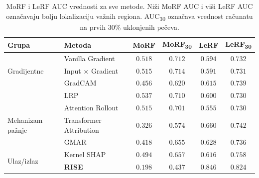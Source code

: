 \begin{table}[h]
\centering
\caption{MoRF i LeRF AUC vrednosti za sve metode. Niži MoRF AUC i 
viši LeRF AUC označavaju bolju lokalizaciju važnih regiona. 
AUC\textsubscript{30} označava vrednost računatu na prvih 30\% 
uklonjenih pečeva.}
\label{tab:morf_lerf}
\begin{tabular}{llcccc}
\hline
\textbf{Grupa} & \textbf{Metoda} & \textbf{MoRF} & \textbf{MoRF\textsubscript{30}} & \textbf{LeRF} & \textbf{LeRF\textsubscript{30}} \\
\hline
\multirow{3}{*}{Gradijentne}
    & Vanilla Gradient        & $0.518$ & $0.712$ & $0.594$ & $0.732$ \\
    & Input $\times$ Gradient & $0.515$ & $0.714$ & $0.591$ & $0.731$ \\
    & GradCAM                 & $0.456$ & $0.620$ & $0.615$ & $0.739$ \\
\hline
    & LRP                     & $0.537$ & $0.710$ & $0.600$ & $0.730$ \\
\hline
\multirow{3}{*}{Mehanizam pažnje}
    & Attention Rollout       & $0.515$ & $0.701$ & $0.555$ & $0.730$ \\
    & Transformer Attribution & $0.326$ & $0.574$ & $0.660$ & $0.742$ \\
    & GMAR                    & $0.418$ & $0.655$ & $0.628$ & $0.736$ \\
\hline
\multirow{2}{*}{Ulaz/izlaz}
    & Kernel SHAP             & $0.494$ & $0.657$ & $0.616$ & $0.758$ \\
    & \textbf{RISE}           & $\mathbf{0.198}$ & $\mathbf{0.437}$ & $\mathbf{0.846}$ & $\mathbf{0.824}$ \\
\hline
\end{tabular}
\end{table}


